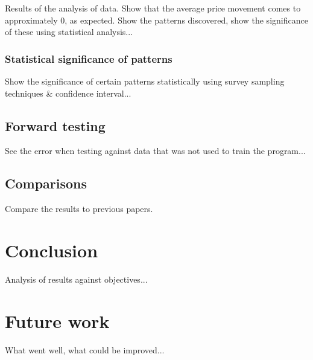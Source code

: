 \documentclass{article}
\begin{document}
Results of the analysis of data. Show that the average price movement comes to approximately 0, as expected. Show the patterns discovered, show the significance of these using statistical analysis...

\subsubsection{Statistical significance of patterns}

Show the significance of certain patterns statistically using survey sampling techniques \& confidence interval...

\subsection{Forward testing}

See the error when testing against data that was not used to train the program...

\subsection{Comparisons}

Compare the results to previous papers.

\section{Conclusion}

Analysis of results against objectives...

\section{Future work}

What went well, what could be improved...



\end{document}
